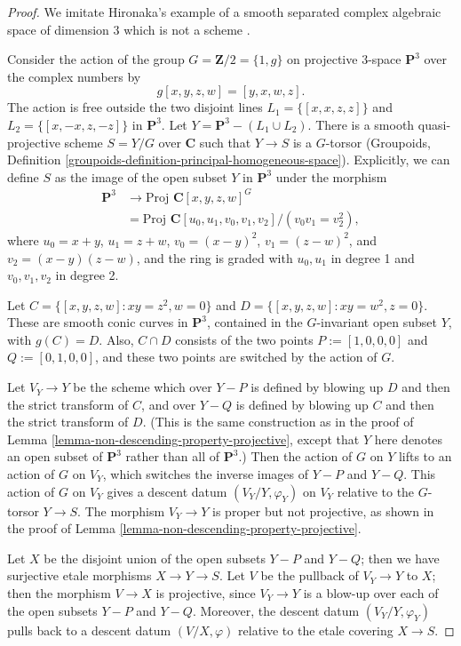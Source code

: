 \begin{proof}
We imitate Hironaka's example of a smooth separated complex
algebraic space of dimension 3
which is not a scheme \cite[Example B.3.4.2]{H}.

\medskip\noindent
Consider the action of the group $G = \mathbf{Z}/2 = \{1, g\}$
on projective 3-space
$\mathbf{P}^3$ over the complex numbers by
$$
g[x,y,z,w] = [y,x,w,z].
$$
The action is free outside the two disjoint lines
$L_1=\{ [x,x,z,z]\}$ and $L_2=\{ [x,-x,z,-z]\}$ in
${\mathbf P}^3$. Let $Y={\mathbf P}^3-(L_1\cup L_2)$. There is a
smooth quasi-projective scheme $S=Y/G$ over ${\mathbf C}$ such that
$Y\to S$ is a $G$-torsor (Groupoids,
Definition \ref{groupoids-definition-principal-homogeneous-space}).
Explicitly, we can define $S$ as the image of the open subset $Y$
in ${\mathbf P}^3$ under the morphism
\begin{align*}
{\mathbf P}^3 & \to \text{Proj } {\mathbf C}[x,y,z,w]^G\\
   & = \text{Proj } {\mathbf C}[u_0,u_1,v_0,v_1,v_2]/(v_0v_1=v_2^2),
\end{align*}
where $u_0=x+y$, $u_1=z+w$, $v_0=(x-y)^2$, $v_1=(z-w)^2$,
and $v_2=(x-y)(z-w)$, and the ring is graded with $u_0,u_1$
in degree 1 and $v_0,v_1,v_2$ in degree 2.

\medskip\noindent
Let $C=\{ [x,y,z,w]: xy=z^2, w=0\}$ and $D=\{ [x,y,z,w]:
xy=w^2, z=0\}$. These are smooth conic curves in ${\mathbf P}^3$, contained
in the $G$-invariant open subset $Y$, with $g(C)=D$. Also,
$C\cap D$ consists of the two points $P:=[1,0,0,0]$
and $Q:=[0,1,0,0]$, and these two points are switched by the action
of $G$. 

\medskip\noindent
Let $V_Y\to Y$ be the scheme which over $Y-P$
is defined by blowing up $D$ and then the strict transform
of $C$, and over $Y-Q$ is defined by blowing up $C$ and then
the strict transform of $D$. (This is the same construction
as in the proof of Lemma \ref{lemma-non-descending-property-projective},
except that $Y$ here denotes an open subset of ${\mathbf P}^3$
rather than all of ${\mathbf P}^3$.)
Then the action of $G$ on $Y$ lifts to an action of $G$ on $V_Y$,
which switches the inverse images of $Y-P$ and $Y-Q$. This action
of $G$ on $V_Y$ gives a descent datum $(V_Y/Y,\varphi_Y)$
on $V_Y$ relative to the $G$-torsor
$Y\to S$. The morphism $V_Y\to Y$
is proper but not projective, as shown in the proof
of Lemma \ref{lemma-non-descending-property-projective}.

\medskip\noindent
Let $X$ be the disjoint union of the open subsets $Y-P$ and $Y-Q$;
then we have surjective etale morphisms $X\to Y\to S$.
Let $V$ be the pullback of $V_Y\to Y$ to $X$; then the morphism
$V\to X$ is projective, since $V_Y\to Y$ is a blow-up over each of the open
subsets $Y-P$ and $Y-Q$. Moreover, the descent datum $(V_Y/Y,\varphi_Y)$
pulls back to a descent datum $(V/X,\varphi)$ relative to the
etale covering $X\to S$.


\end{proof}

